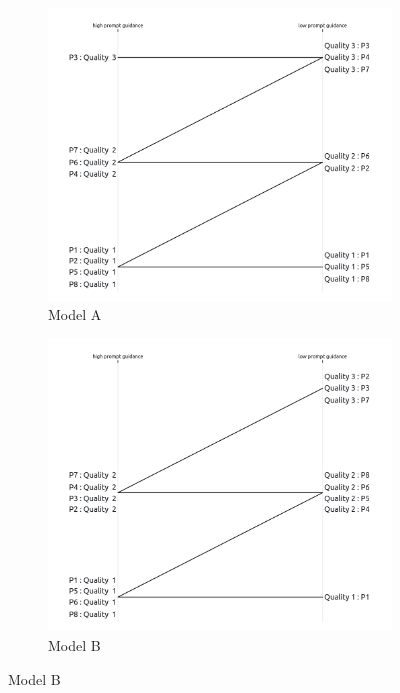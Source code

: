 \begin{figure}[h]
	\centering
	\begin{subfigure}{0.24\linewidth}
		\includegraphics[width=\textwidth]{Figures/results/qualitative_A.png}
		\caption{Model A}
	\end{subfigure}
	\begin{subfigure}{0.24\linewidth}
		\includegraphics[width=\textwidth]{Figures/results/qualitative_B.png}
		\caption{Model B}
	\end{subfigure}

\end{figure}
